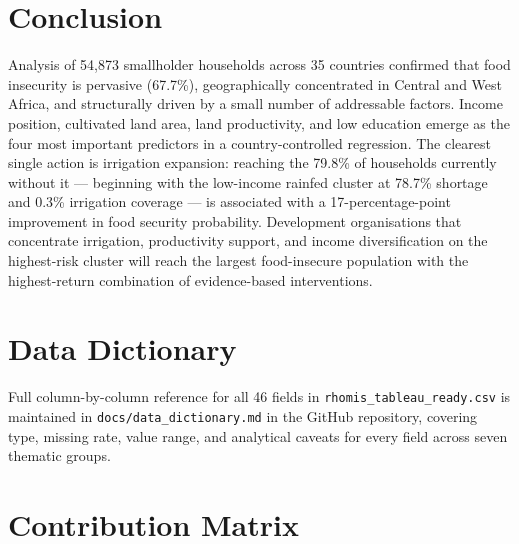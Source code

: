 \documentclass[11pt,a4paper]{article}
\begin{document}
\newpage

\section{Conclusion}

Analysis of 54,873 smallholder households across 35 countries confirmed that food insecurity is pervasive (67.7\%), geographically concentrated in Central and West Africa, and structurally driven by a small number of addressable factors. Income position, cultivated land area, land productivity, and low education emerge as the four most important predictors in a country-controlled regression. The clearest single action is irrigation expansion: reaching the 79.8\% of households currently without it — beginning with the low-income rainfed cluster at 78.7\% shortage and 0.3\% irrigation coverage — is associated with a 17-percentage-point improvement in food security probability. Development organisations that concentrate irrigation, productivity support, and income diversification on the highest-risk cluster will reach the largest food-insecure population with the highest-return combination of evidence-based interventions.

\appendix
\renewcommand{\thesection}{\Alph{section}}

\section{Data Dictionary}

Full column-by-column reference for all 46 fields in \texttt{rhomis\_tableau\_ready.csv} is maintained in \texttt{docs/data\_dictionary.md} in the GitHub repository, covering type, missing rate, value range, and analytical caveats for every field across seven thematic groups.

\section{Contribution Matrix}
\end{document}
